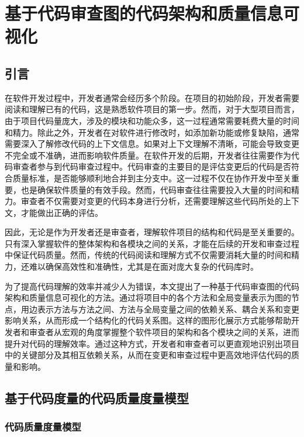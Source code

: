\chapter{基于代码审查图的代码架构和质量信息可视化}
\section{引言}


在软件开发过程中，开发者通常会经历多个阶段。在项目的初始阶段，开发者需要阅读和理解已有的代码，这是熟悉软件项目的第一步。然而，对于大型项目而言，由于项目代码量庞大，涉及的模块和功能众多，这一过程通常需要耗费大量的时间和精力。除此之外，开发者在对软件进行修改时，如添加新功能或修复缺陷，通常需要深入了解修改代码的上下文信息。如果对上下文理解不清晰，可能会导致变更不完全或不准确，进而影响软件质量。在软件开发的后期，开发者往往需要作为代码审查者参与到代码审查过程中。代码审查的主要目的是评估变更后的代码是否符合质量标准，是否能够顺利地合并到主分支中。这一过程不仅在协作开发中至关重要，也是确保软件质量的有效手段。然而，代码审查往往需要投入大量的时间和精力\cite{花子涵2024代码审查自动化研究综述}。审查者不仅需要对变更的代码本身进行分析，还需要理解这些代码所处的上下文，才能做出正确的评估。

因此，无论是作为开发者还是审查者，理解软件项目的结构和代码是至关重要的。只有深入掌握软件的整体架构和各模块之间的关系，才能在后续的开发和审查过程中保证代码质量。然而，传统的代码阅读和理解方式不仅需要消耗大量的时间和精力，还难以确保高效性和准确性，尤其是在面对庞大复杂的代码库时。

为了提高代码理解的效率并减少人为错误，本文提出了一种基于代码审查图的代码架构和质量信息可视化的方法。通过将项目中的各个方法和全局变量表示为图的节点，用边表示方法与方法之间、方法与全局变量之间的依赖关系、耦合关系和变更影响关系，从而形成一个结构化的代码关系图。这样的图形化展示方式能够帮助开发者和审查者从宏观的角度掌握整个软件项目的架构和各个模块之间的关系，进而提升对代码的理解效率。通过这种方式，开发者和审查者可以更直观地识别出项目中的关键部分及其相互依赖关系，从而在变更和审查过程中更高效地评估代码的质量和影响。

\section{基于代码度量的代码质量度量模型}

\subsection{代码质量度量模型}


